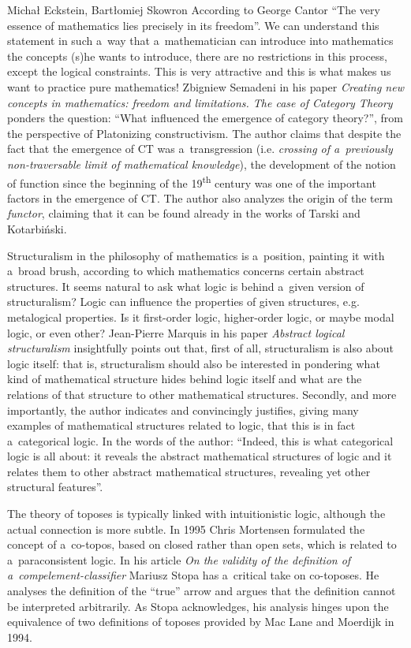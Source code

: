 \begin{editorialeng}{Michał Eckstein, Bartłomiej Skowron}
According to George Cantor ``The very essence of mathematics lies precisely in its freedom''. We can understand this statement in such a~way that a~mathematician can introduce into mathematics the concepts (s)he wants to introduce, there are no restrictions in this process, except the logical constraints. This is very attractive and this is what makes us want to practice pure mathematics! Zbigniew Semadeni in his paper \textit{Creating new concepts in mathematics: freedom and limitations. The case of Category Theory} ponders the question: ``What influenced the emergence of category theory?'', from the perspective of Platonizing constructivism. The author claims that despite the fact that the emergence of CT was a~transgression (i.e. \textit{crossing of a~previously non-traversable limit of mathematical knowledge}), the development of the notion of function since the beginning of the 19\textsuperscript{th} century was one of the important factors in the emergence of CT. The author also analyzes the origin of the term \textit{functor}, claiming that it can be found already in the works of Tarski and Kotarbiński.

Structuralism in the philosophy of mathematics is a~position, painting it with a~broad brush, according to which mathematics concerns certain abstract structures. It seems natural to ask what logic is behind a~given version of structuralism? Logic can influence the properties of given structures, e.g. metalogical properties. Is it first-order logic, higher-order logic, or maybe modal logic, or even other? Jean-Pierre Marquis in his paper \textit{Abstract logical structuralism} insightfully points out that, first of all, structuralism is also about logic itself: that is, structuralism should also be interested in pondering what kind of mathematical structure hides behind logic itself and what are the relations of that structure to other mathematical structures. Secondly, and more importantly, the author indicates and convincingly justifies, giving many examples of mathematical structures related to logic, that this is in fact a~categorical logic. In the words of the author: ``Indeed, this is what categorical logic is all about: it reveals the abstract mathematical structures of logic and it relates them to other abstract mathematical structures, revealing yet other structural features''.

The theory of toposes is typically linked with intuitionistic logic, although the actual connection is more subtle. In 1995 Chris Mortensen formulated the concept of a~co-topos, based on closed rather than open sets, which is related to a~paraconsistent logic. In his article \textit{On the validity of the definition of a~compelement-classifier} Mariusz Stopa has a~critical take on co-toposes. He analyses the definition of the ``true'' arrow and argues that the definition cannot be interpreted arbitrarily. As Stopa acknowledges, his analysis hinges upon the equivalence of two definitions of toposes provided by Mac Lane and Moerdijk in 1994.


\end{editorialeng}
